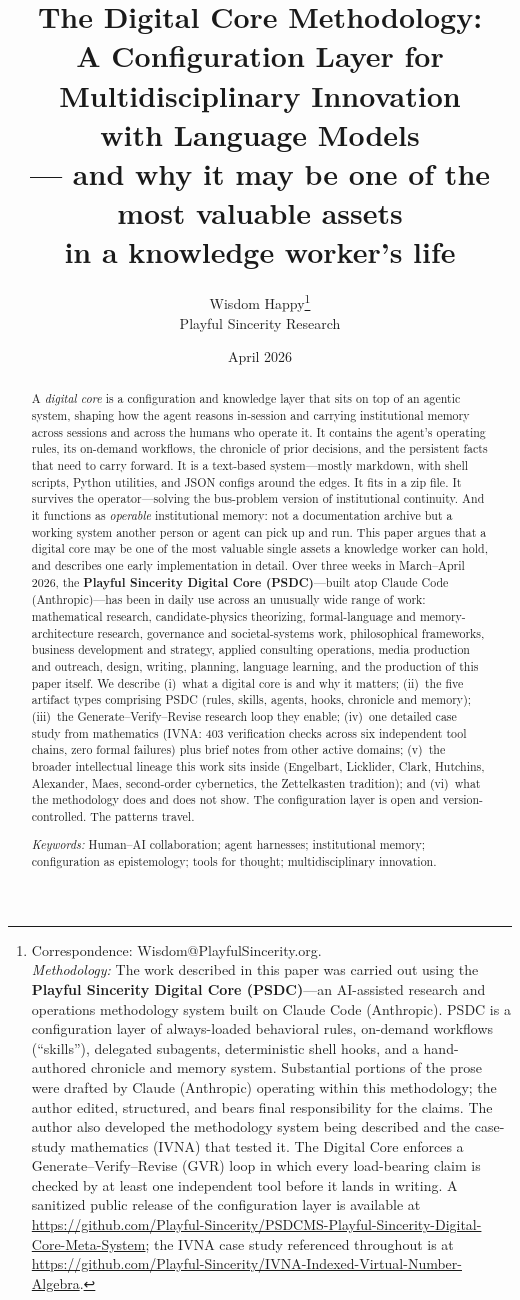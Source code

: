 \documentclass[12pt]{article}
\title{The Digital Core Methodology: \\
A Configuration Layer for Multidisciplinary Innovation \\
with Language Models \\[0.4em]
\large{--- and why it may be one of the most valuable assets \\
in a knowledge worker's life}}
\author{Wisdom Happy\thanks{Correspondence: Wisdom@PlayfulSincerity.org. \\[0.5em]
\textit{Methodology:} The work described in this paper was carried out using the \textbf{Playful Sincerity Digital Core (PSDC)}---an AI-assisted research and operations methodology system built on Claude Code (Anthropic). PSDC is a configuration layer of always-loaded behavioral rules, on-demand workflows (``skills''), delegated subagents, deterministic shell hooks, and a hand-authored chronicle and memory system. Substantial portions of the prose were drafted by Claude (Anthropic) operating within this methodology; the author edited, structured, and bears final responsibility for the claims. The author also developed the methodology system being described and the case-study mathematics (IVNA) that tested it. The Digital Core enforces a Generate--Verify--Revise (GVR) loop in which every load-bearing claim is checked by at least one independent tool before it lands in writing. A sanitized public release of the configuration layer is available at \url{https://github.com/Playful-Sincerity/PSDCMS-Playful-Sincerity-Digital-Core-Meta-System}; the IVNA case study referenced throughout is at \url{https://github.com/Playful-Sincerity/IVNA-Indexed-Virtual-Number-Algebra}.} \\[0.3em]
Playful Sincerity Research}
\date{April 2026}
\begin{document}
\maketitle

\begin{abstract}
A \emph{digital core} is a configuration and knowledge layer that sits on top of an agentic system, shaping how the agent reasons in-session and carrying institutional memory across sessions and across the humans who operate it. It contains the agent's operating rules, its on-demand workflows, the chronicle of prior decisions, and the persistent facts that need to carry forward. It is a text-based system---mostly markdown, with shell scripts, Python utilities, and JSON configs around the edges. It fits in a zip file. It survives the operator---solving the bus-problem version of institutional continuity. And it functions as \emph{operable} institutional memory: not a documentation archive but a working system another person or agent can pick up and run. This paper argues that a digital core may be one of the most valuable single assets a knowledge worker can hold, and describes one early implementation in detail. Over three weeks in March--April 2026, the \textbf{Playful Sincerity Digital Core (PSDC)}---built atop Claude Code (Anthropic)---has been in daily use across an unusually wide range of work: mathematical research, candidate-physics theorizing, formal-language and memory-architecture research, governance and societal-systems work, philosophical frameworks, business development and strategy, applied consulting operations, media production and outreach, design, writing, planning, language learning, and the production of this paper itself. We describe (i)~what a digital core is and why it matters; (ii)~the five artifact types comprising PSDC (rules, skills, agents, hooks, chronicle and memory); (iii)~the Generate--Verify--Revise research loop they enable; (iv)~one detailed case study from mathematics (IVNA: 403 verification checks across six independent tool chains, zero formal failures) plus brief notes from other active domains; (v)~the broader intellectual lineage this work sits inside (Engelbart, Licklider, Clark, Hutchins, Alexander, Maes, second-order cybernetics, the Zettelkasten tradition); and (vi)~what the methodology does and does not show. The configuration layer is open and version-controlled. The patterns travel.

\medskip
\noindent\textit{Keywords:} Human--AI collaboration; agent harnesses; institutional memory; configuration as epistemology; tools for thought; multidisciplinary innovation.
\end{abstract}
\end{document}

